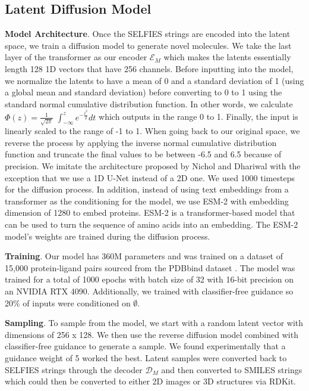 \documentclass[11pt]{article}
\begin{document}
\subsection{Latent Diffusion Model}
\textbf{Model Architecture}.
Once the SELFIES strings are encoded into the latent space, we 
train a diffusion model to generate novel molecules. We take the 
last layer of the transformer as our encoder $\mathcal{E}_M$ which
makes the latents essentially length 128 1D vectors that have 
256 channels. Before inputting into the model, we normalize the 
latents to have a mean of 0 and a standard deviation of 1 (using a global mean and standard deviation) 
before converting 
to 0 to 1 using the standard normal cumulative distribution function. In other words,
we calculate $\Phi(z) = \frac{1}{\sqrt{2 \pi}}$ $\int_{-\infty}^{z} e^{-\frac{t^2}{2}} dt$
which outputs in the range 0 to 1.
Finally, the input is linearly scaled to the range of -1 to 1. 
When going back to our original space, we reverse the process by applying the inverse normal cumulative distribution function and
truncate the final values to be between -6.5 and 6.5 because of precision.
We imitate the architecture proposed by Nichol and 
Dhariwal \cite{nichol2022glidephotorealisticimagegeneration} with the exception that we use a 1D U-Net instead 
of a 2D one. We used 1000 timesteps for the diffusion process.
In addition, instead of using text embeddings from a 
transformer as the conditioning for the model, we use ESM-2 \cite{Lin2022.07.20.500902} with 
embedding dimension of 1280 to embed proteins. 
ESM-2 is a transformer-based model 
that can be used to turn the sequence of amino acids into an embedding.
The ESM-2 model's weights are trained during the diffusion process.

\textbf{Training}.
Our model has 360M parameters and was trained on a dataset of 
15,000 protein-ligand pairs sourced from the PDBbind dataset \cite{Wang2005Jun}.
The model was trained for a total of 1000 epochs with batch size 
of 32 with 16-bit precision on an NVIDIA RTX 4090. Additionally, we 
trained with classifier-free guidance so 20\% of inputs were conditioned on 
$\emptyset$.

\textbf{Sampling}.
To sample from the model, we start with a random latent vector 
with dimensions of 256 x 128. We then use the reverse diffusion model
combined with classifier-free guidance to generate a sample. 
We found experimentally that a guidance weight of 5 worked 
the best. Latent samples were converted back to SELFIES strings 
through the decoder $\mathcal{D}_M$ and then converted to SMILES
strings which could then be converted to either 2D images or 
3D structures via RDKit.
\end{document}
